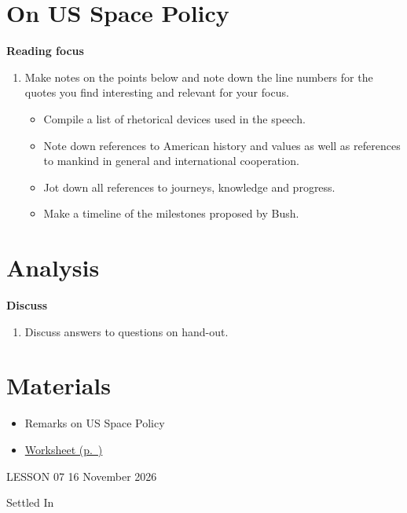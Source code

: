 \documentclass[11pt,a4paper,oneside]{book}
\newcommand{\tasktitle}[1]{{\color{blue}\bfseries #1}\par\smallskip}
\begin{document}
\section*{On US Space Policy}
\begin{taskbox}
\tasktitle{Reading focus}
\begin{enumerate}
\item Make notes on the points below and note down the line numbers for the quotes you find interesting and relevant for your focus.

\begin{itemize}
\item Compile a list of rhetorical devices used in the speech.
\item Note down references to American history and values as well as references to mankind in general and international cooperation.
\item Jot down all references to journeys, knowledge and progress.
\item Make a timeline of the milestones proposed by Bush.
\end{itemize}

\end{enumerate}
\end{taskbox}

\section*{Analysis}
\begin{taskbox}
\tasktitle{Discuss}
\begin{enumerate}
\item Discuss answers to questions on hand-out.
\end{enumerate}
\end{taskbox}

\section*{Materials}

\begin{itemize}
\item Remarks on US Space Policy
\item \hyperref[worksheet-18]{Worksheet (p.~\pageref*{worksheet-18})}
\end{itemize}

\clearpage{}
{\color{blue}\small LESSON 07 \hfill 16 November 2026\par}
\vspace{4mm}
{\displayfont\color{navy}\fontsize{30}{34}\selectfont Settled In\par}\vspace{4mm}
\end{document}
